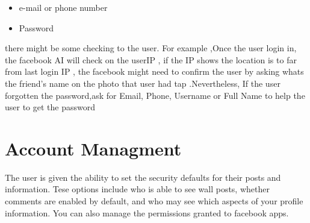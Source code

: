 \begin{itemize}
\item e-mail or phone number 
\item Password
\end{itemize}

there might be some checking to the user. For example ,Once the user login in,
the facebook AI will check on the userIP , if the IP shows the location is to
far from last login IP , the facebook might need to confirm the user by asking
whats the friend's name on the photo that user had tap .Nevertheless, If the
user forgotten the password,ask for Email, Phone, Username or Full Name to help
the user to get the password

\section{Account Managment}
The user is given the ability to set the security defaults for their posts and
information. Tese options include who is able to see wall posts, whether
comments are enabled by default, and who may see which aspects of your profile
information. You can also manage the permissions granted to facebook apps.
